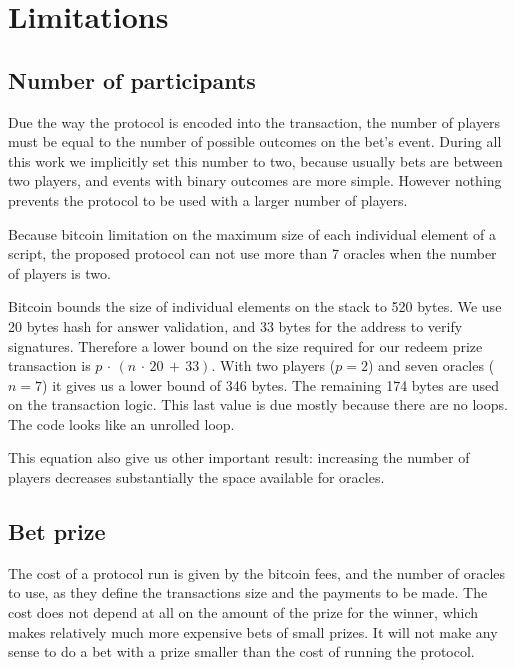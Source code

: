 \section{Limitations}

\subsection{Number of participants}

Due the way the protocol is encoded into the transaction, the number of players
  must be equal to the number of possible outcomes on the bet's event.
During all this work we implicitly set this number to two, because usually bets
  are between two players, and events with binary outcomes are more simple.
However nothing prevents the protocol to be used with a larger number of
  players.

Because bitcoin limitation on the maximum size of each individual element of
  a script, the proposed protocol can not use more than 7 oracles when the
  number of players is two.

Bitcoin bounds the size of individual elements on the stack to 520 bytes.
We use 20 bytes hash for answer validation, and 33 bytes for the address
  to verify signatures. Therefore a lower bound on the size required for our redeem
  prize transaction is
  $ p\, \cdot\, (n\, \cdot\, 20\, +\, 33)$.
With two players ($p = 2$) and seven oracles ($n = 7$) it gives us a lower
  bound of 346 bytes.
The remaining 174 bytes are used on the transaction logic. This last value is
  due mostly because there are no loops. The code looks like an unrolled loop.

This equation also give us other important result: increasing the number of
  players decreases substantially the space available for oracles.

\subsection{Bet prize}

The cost of a protocol run is given by the bitcoin fees, and the number
  of oracles to use, as they define the transactions size and the payments
  to be made.
The cost does not depend at all on the amount of the prize for the winner,
  which makes relatively much more expensive bets of small prizes.
It will not make any sense to do a bet with a prize smaller than the cost
  of running the protocol.
